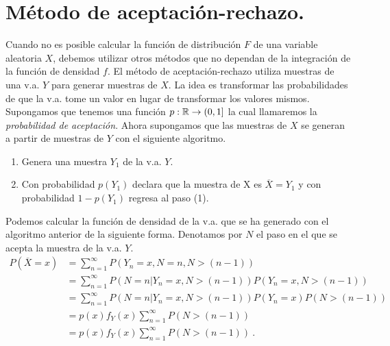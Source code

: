 \documentclass[12pt,reqno]{amsart}\usepackage[]{graphicx}\usepackage[]{color}
\begin{document}
\section{Método de aceptación-rechazo.}
Cuando no es posible calcular la función de distribución $F$ de una variable aleatoria $X$, debemos utilizar otros métodos que no dependan de la integración de la función de densidad $f$. El método de aceptación-rechazo utiliza muestras de una v.a. $Y$ para generar muestras de $X$. La idea es transformar las probabilidades de que la v.a. tome un valor en lugar de transformar los valores mismos. Supongamos que tenemos una función $p:\mathbb{R}\to(0,1]$ la cual llamaremos la \emph{probabilidad de aceptación}. Ahora supongamos que las muestras de $X$ se generan a partir de muestras de $Y$ con el siguiente algoritmo.
\begin{enumerate}
\item Genera una muestra $Y_{1}$ de la v.a. $Y$.
\item Con probabilidad $p(Y_{1})$ declara que la muestra de X es $\overline{X}=Y_{1}$ y con probabilidad $1-p(Y_{1})$ regresa al paso (1).
\end{enumerate}
Podemos calcular la función de densidad de la v.a. que se ha generado con el algoritmo anterior de la siguiente forma. Denotamos por $N$ el paso en el que se acepta la muestra de la v.a. $Y$.
\begin{equation}
  \begin{split}
  P(\overline{X} = x )
  &=\sum_{n=1}^{\infty} P( Y_n =x , N = n , N > (n-1) )\\
  &=\sum_{n=1}^{\infty} P( N = n | Y_n = x , N >(n-1) ) P( Y_n = x , N >(n-1) )\\
  &= \sum_{n=1}^{\infty} P( N = n | Y_n = x , N >(n-1) ) P( Y_n = x ) P (N >(n-1))\\
  &= p(x) f_{Y}(x) \sum_{n=1}^{\infty} P (N >(n-1))\\
  &= p(x) f_{Y}(x) \sum_{n=1}^{\infty} P(N >(n-1))\:.
  \end{split}
\end{equation}
\end{document}
